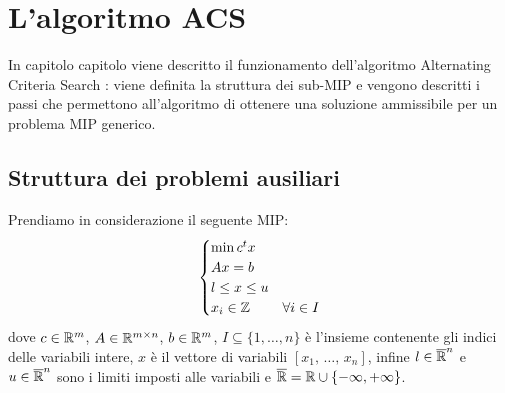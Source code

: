 \chapter{L'algoritmo ACS}%
\label{cha:L'algoritmo ACS}
In capitolo capitolo viene descritto il funzionamento dell'algoritmo
Alternating Criteria Search \cite{acsPaper}: viene definita la struttura dei sub-MIP e
vengono descritti i passi che permettono all'algoritmo di ottenere una
soluzione ammissibile per un problema MIP generico.

\section{Struttura dei problemi ausiliari}%
\label{sec:Struttura dei problemi ausiliari}
Prendiamo in considerazione il seguente MIP:
\begin{equation}
    \begin{cases}
        \min c^tx\\
        Ax = b\\
        l \leq x \leq u\\
        x_i \in \mathbb{Z} & \forall i\in I
    \end{cases}
\end{equation}
dove $c\in \mathbb{R}^m$, $A\in \mathbb{R}^{m\times n}$, $b\in \mathbb{R}^m$, $I\subseteq \{ 1, \ldots, n\}$
è l'insieme contenente gli indici delle variabili intere, $x$ è il vettore
di variabili $[x_1,\,\ldots,\,x_n]$, infine $l\in \overline {\mathbb{R}}^n$ e $u\in \overline {\mathbb{R}}^n$ sono i
limiti imposti alle variabili e $\overline {\mathbb{R}} = \mathbb{R} \cup \{-\infty, +\infty\}$.

